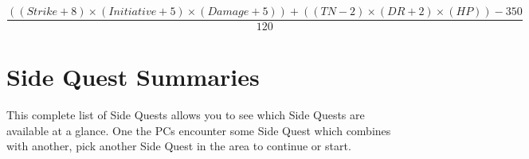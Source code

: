\begin{equation}
\frac{(( Strike + 8 ) \times ( Initiative + 5) \times ( Damage + 5 ) ) + ( ( TN -2 ) \times ( DR + 2 ) \times ( HP )) - 350}{120}
\end{equation}

\chapter{Side Quest Summaries}
\label{sqSummaries}

This complete list of Side Quests allows you to see which Side Quests are available at a glance.
One the PCs encounter some Side Quest which combines with another, pick another Side Quest in the area to continue or start.



